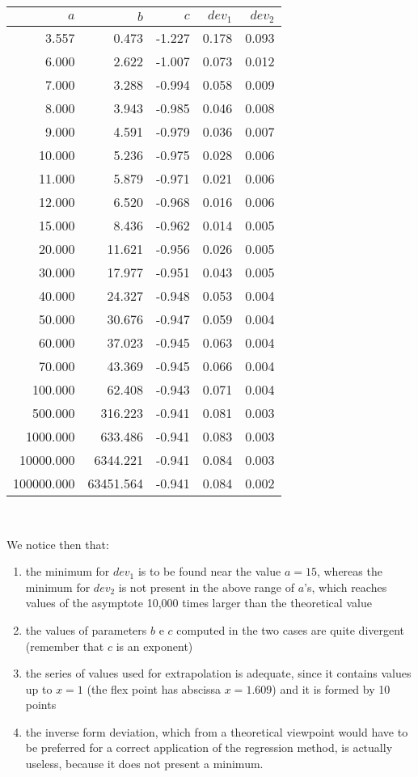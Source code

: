 \documentclass[%
 aip,
 jmp,%
 amsmath,amssymb,
 reprint,%
]{revtex4-1}
\begin{document}
{\centering
\begin{tabular}{r@{\hskip 5mm}r@{\hskip 5mm}r@{\hskip 5mm}r@{\hskip 5mm}r}
 $a$ & $b$ & $c$ & $dev_1$ & $dev_2$  \\ \hline
 3.557 & 0.473 & -1.227 & 0.178 & 0.093 \\
 6.000 & 2.622 & -1.007 & 0.073 & 0.012 \\
 7.000 & 3.288 & -0.994 & 0.058 & 0.009 \\ 
 8.000 & 3.943 & -0.985 & 0.046 & 0.008 \\
 9.000 & 4.591 & -0.979 & 0.036	& 0.007 \\ 
 10.000 & 5.236 & -0.975 & 0.028 & 0.006 \\
 11.000 & 5.879 & -0.971 & 0.021 & 0.006 \\
 12.000 & 6.520 & -0.968 & 0.016 & 0.006 \\
 15.000 & 8.436 & -0.962 & 0.014 & 0.005 \\
 20.000 & 11.621 & -0.956 & 0.026 & 0.005 \\
 30.000 & 17.977 & -0.951 & 0.043 & 0.005 \\
 40.000 & 24.327 & -0.948 & 0.053 & 0.004 \\
 50.000 & 30.676 & -0.947 & 0.059 & 0.004 \\
 60.000 & 37.023 & -0.945 & 0.063 & 0.004 \\
 70.000 & 43.369 & -0.945 & 0.066 & 0.004 \\
 100.000 & 62.408 & -0.943 & 0.071 & 0.004 \\
 500.000 & 316.223 & -0.941 & 0.081 & 0.003 \\ 
 1000.000 & 633.486 & -0.941 & 0.083 & 0.003 \\
 10000.000 & 6344.221 & -0.941 & 0.084 & 0.003 \\
 100000.000 & 63451.564 & -0.941 & 0.084 & 0.002 \\	  
\end{tabular}\\[4mm]}
	
We notice then that:

\begin{enumerate}
\item the minimum for $dev_1$ is to be found near the value $a = 15$, whereas the minimum for $dev_2$ is not present in the above range of $a$'s, which reaches values of the asymptote 10,000 times larger than the theoretical value
\item the values of parameters $b$ e $c$ computed in the two cases are quite divergent (remember that $c$ is an exponent)
\item the series of values used for extrapolation is adequate, since it contains values up to $x = 1$ (the flex point has  abscissa $x =  1.609$) and it is formed by 10 points
\item the inverse form deviation, which from a theoretical viewpoint would have to be preferred for a correct application of the regression method, is actually useless, because it does not present a minimum.
\end{enumerate}
\end{document}
